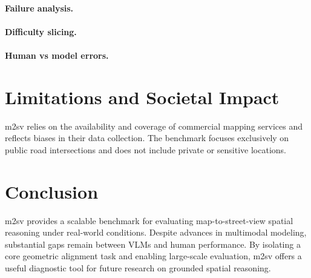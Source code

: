 \documentclass{article}
\begin{document}
\paragraph{Failure analysis.}

\paragraph{Difficulty slicing.}

\paragraph{Human vs model errors.}

\section{Limitations and Societal Impact}

m2sv relies on the availability and coverage of commercial mapping services and
reflects biases in their data collection. The benchmark focuses exclusively on
public road intersections and does not include private or sensitive locations.

\section{Conclusion}

m2sv provides a scalable benchmark for evaluating map-to-street-view spatial
reasoning under real-world conditions. Despite advances in multimodal modeling,
substantial gaps remain between VLMs and human performance. By isolating a core
geometric alignment task and enabling large-scale evaluation, m2sv offers a
useful diagnostic tool for future research on grounded spatial reasoning.


\end{document}
